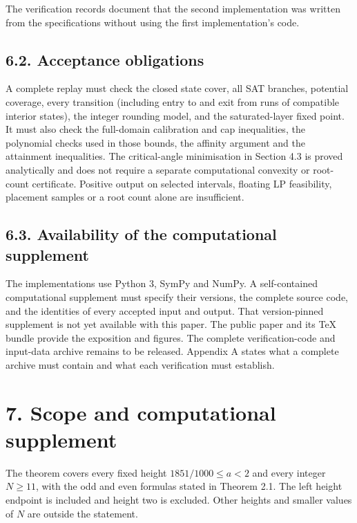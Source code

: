\documentclass[
  11pt,
  a4paper,
]{article}
\begin{document}
The verification records document that the second implementation was
written from the specifications without using the first implementation's
code.

\subsection{6.2. Acceptance obligations}\label{acceptance-obligations}

A complete replay must check the closed state cover, all SAT branches, potential coverage, every transition (including entry to and exit from runs of compatible interior states), the integer rounding model, and the saturated-layer fixed point. It must also check the full-domain calibration and cap inequalities, the polynomial checks used in those bounds, the affinity argument and the attainment inequalities. The critical-angle minimisation in Section 4.3 is proved analytically and does not require a separate computational convexity or root-count certificate. Positive output on selected intervals, floating LP feasibility, placement samples or a root count alone are insufficient.

\subsection{6.3. Availability of the computational
supplement}\label{availability-of-the-computational-supplement}

The implementations use Python 3, SymPy and NumPy. A self-contained
computational supplement must specify their versions, the complete
source code, and the identities of every accepted input and output. That
version-pinned supplement is not yet available with this paper. The
public paper and its TeX bundle provide the exposition and figures. The
complete verification-code and input-data archive remains to be
released. Appendix A states what a complete archive must contain and
what each verification must establish.

\section{7. Scope and computational
supplement}\label{scope-and-computational-supplement}

The theorem covers every fixed height \(1851/1000\le a<2\) and every
integer \(N\ge11\), with the odd and even formulas stated in Theorem
2.1. The left height endpoint is included and height two is excluded.
Other heights and smaller values of \(N\) are outside the statement.
\end{document}
